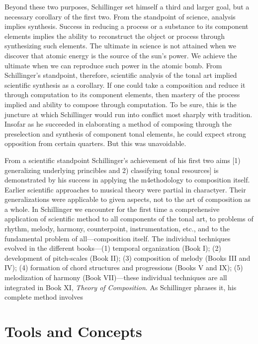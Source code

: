 Beyond these two purposes, Schillinger set himself a third and larger goal, but a necessary corollary of the first two. From the standpoint of science, analysis implies synthesis. Success in reducing a process or a substance to its component elements implies the ability to reconstruct the object or process through synthesizing such elements. The ultimate in science is not attained when we discover that atomic energy is the source of the sun's power. We achieve the ultimate when we can reproduce such power in the atomic bomb. From Schillinger's standpoint, therefore, scientific analysis of the tonal art implied scientific synthesis as a corollary. If one could take a composition and reduce it through computation to its component elements, then mastery of the process implied and ability to compose through computation. To be sure, this is the juncture at which Schillinger would run into conflict most sharply with tradition. Insofar as he succeeded in elaborating a method of composing through the preselection and synthesis of component tonal elements, he could expect strong opposition from certain quarters. But this was unavoidable.

From a scientific standpoint Schillinger's achievement of his first two aims [1) generalizing underlying princibles and 2) classifying tonal resources] is demonstrated by his success in applying the m4ethodology to composition itself. Earlier scientific approaches to musical theory were partial in charactyer. Their generalizations were applicable to given aspects, not to the art of composition as a whole. In Schillinger we encounter for the first time a comprehensive application of scientific method to all components of the tonal art, to problems of rhythm, melody, harmony, counterpoint, instrumentation, etc., and to the fundamental problem of all---composition itself. The individual techniques evolved in the different books---(1) temporal organization (Book I); (2) development of pitch-scales (Book II); (3) composition of melody (Books III and IV); (4) formation of chord structures and progressions (Books V and IX); (5) melodization of harmony (Book VII)---these individual techniques are all integrated in Book XI, \textit{Theory of Composition}. As Schillinger phrases it, his complete method involves 

\section{Tools and Concepts}

